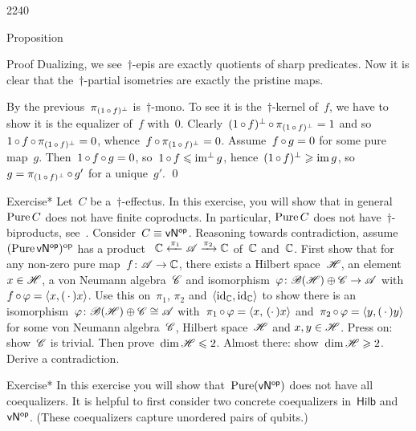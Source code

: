 \begin{parsec}{2240}
\begin{point}{30}{Proposition}
\begin{point}{40}{Proof}
Dualizing, we see~$\dagger$-epis are exactly quotients of sharp predicates.
Now it is clear that the~$\dagger$-partial isometries
are exactly the pristine maps.
\begin{point}{50}%
By the previous~$\pi_{(1 \mathop{\circ} f)^\perp}$ is~$\dagger$-mono.
To see it is the~$\dagger$-kernel of~$f$,
we have to show it is the equalizer of~$f$ with~$0$.
Clearly~$(1 \mathop{\circ} f )^\perp \mathop{\circ} \pi_{(1 \mathop{\circ} f)^\perp} = 1$
and so~$1 \mathop{\circ} f \mathop{\circ} \pi_{(1 \mathop{\circ} f)^\perp} = 0$,
whence~$f \mathop{\circ} \pi_{(1 \mathop{\circ} f)^\perp} = 0$.
Assume~$f \mathop{\circ} g = 0$ for some pure map~$g$.
Then~$1 \mathop{\circ} f \mathop{\circ} g = 0$,
    so~$1 \mathop{\circ} f \leqslant \operatorname{im^\perp} g$,
    hence~$(1 \mathop{\circ} f)^\perp \geqslant \operatorname{im} g$,
    so~$g = \pi_{(1 \mathop{\circ} f)^\perp} \mathop{\circ} g'$
    for a unique~$g'$. \qed
\end{point}
\end{point}
\end{point}
\begin{point}{60}{Exercise*}%
Let~$C$ be a~$\dagger$-effectus.
In this exercise, you will show that
    in general $\operatorname{Pure} C$
    does not have finite coproducts.
In particular, $\operatorname{Pure} C$ does not have~$\dagger$-biproducts,
    see~\cite[3.2.15]{heunenphd}.
Consider~$C \equiv {\mathsf{vN}}{^{\mathsf{op}}}$.
Reasoning towards contradiction,
    assume~$(\operatorname{Pure} {\mathsf{vN}}{^{\mathsf{op}}})^{\mathrm{op}}$
    has a product~$\ \C \xleftarrow{\pi_1} \scrA \xrightarrow{\pi_2} \C$
    of~$\mathbb{C} $ and~$\mathbb{C}$.
First show that for any non-zero pure map~$f\colon \mathscr{A} \to \mathbb{C}$,
    there exists a Hilbert space~$\mathscr{H}$, an element~$x \in \mathscr{H}$,
    a von Neumann algebra~$\mathscr{C}$ and
    isomorphism~$\varphi\colon \mathscr{B}(\mathscr{H})\oplus \mathscr{C} \to \mathscr{A}$
    with~$f \mathop{\circ} \varphi = \langle x, (\,\cdot\,) x\rangle $.
Use this on~$\pi_1$, $\pi_2$ and~$\langle\mathrm{id}_{\mathbb{C}},\mathrm{id}_{\mathbb{C}}\rangle $
    to show there is an
    isomorphism~$\varphi\colon  \mathscr{B}(\mathscr{H}) \oplus \mathscr{C} \cong \mathscr{A}$
    with~$\pi_1 \mathop{\circ} \varphi = \left<x,\,(\cdot\,)x\right>$
    and~$\pi_2 \mathop{\circ} \varphi = \left<y,(\,\cdot\,)y\right>$
    for some von Neumann algebra~$\mathscr{C}$,
    Hilbert space~$\mathscr{H}$ and $x,y \in \mathscr{H}$.
Press on: show~$\mathscr{C}$ is trivial.
    Then prove~$\dim \mathscr{H} \leqslant 2$.
    Almost there: show~$\dim \mathscr{H} \geqslant 2$.
    Derive a contradiction.
\end{point}
\begin{point}{70}{Exercise*}%
In this exercise you will show that~$\operatorname{Pure}({\mathsf{vN}}{^{\mathsf{op}}})$ does not have
    all coequalizers.  It is helpful to first consider
    two concrete coequalizers in~$\mathsf{Hilb}$ and~${\mathsf{vN}}{^{\mathsf{op}}}$.
(These coequalizers capture unordered pairs of qubits.)


\end{point}
\end{parsec}
